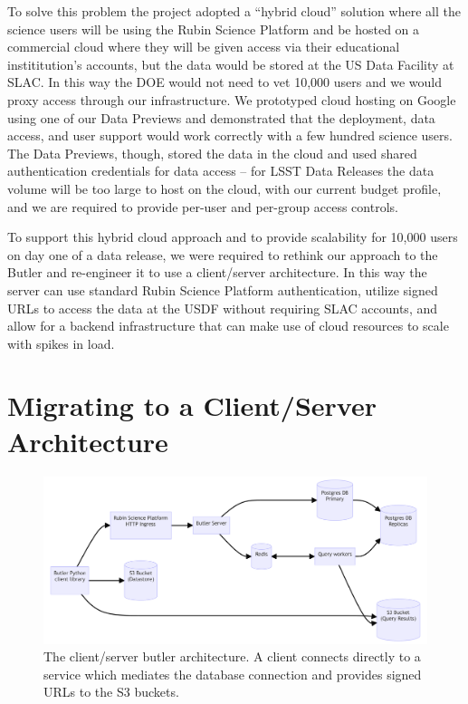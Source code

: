 To solve this problem the project adopted a ``hybrid cloud'' solution \cite{2024SPIE13101.86Otmp} where all the science users will be using the Rubin Science Platform \cite{LDM-542} and be hosted on a commercial cloud where they will be given access via their educational instititution's accounts, but the data would be stored at the US Data Facility at SLAC.
In this way the DOE would not need to vet 10,000 users and we would proxy access through our infrastructure.
We prototyped cloud hosting on Google using one of our Data Previews \cite{2021arXiv211115030O} and demonstrated that the deployment, data access, and user support would work correctly with a few hundred science users.
The Data Previews, though, stored the data in the cloud and used shared authentication credentials for data access -- for LSST Data Releases the data volume will be too large to host on the cloud, with our current budget profile, and we are required to provide per-user and per-group access controls.

To support this hybrid cloud approach and to provide scalability for 10,000 users on day one of a data release, we were required to rethink our approach to the Butler and re-engineer it to use a client/server architecture.
In this way the server can use standard Rubin Science Platform authentication, \cite{DMTN-182} utilize signed URLs to access the data at the USDF without requiring SLAC accounts, \cite{DMTN-284} and allow for a backend infrastructure that can make use of cloud resources to scale with spikes in load.

\section{Migrating to a Client/Server Architecture}

\begin{figure}
\centering
\includegraphics[width=\textwidth]{butler-client-server}
\caption{The client/server butler architecture. A client connects directly to a service which mediates the database connection and provides signed URLs to the S3 buckets.\label{fig:server}}
\end{figure}

